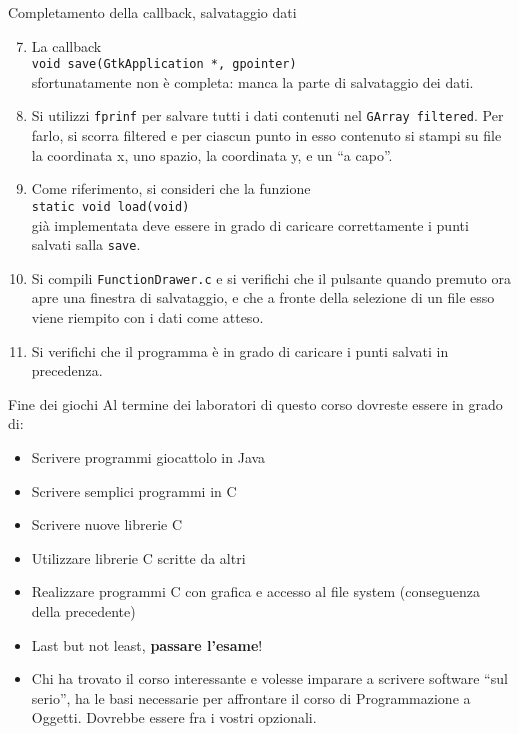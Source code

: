 \documentclass{beamer}
\begin{document}
\begin{frame}[fragile]{Completamento della callback, salvataggio dati}
\begin{enumerate}
\setcounter{enumi}{6}
 \item La callback \\ \texttt{void save(GtkApplication *, gpointer)} \\ sfortunatamente non è completa: manca la parte di salvataggio dei dati.
 \item Si utilizzi \texttt{fprinf} per salvare tutti i dati contenuti nel \texttt{GArray filtered}. Per farlo, si scorra filtered e per ciascun punto in esso contenuto si stampi su file la coordinata x, uno spazio, la coordinata y, e un ``a capo''.
 \item Come riferimento, si consideri che la funzione \\ \texttt{static void load(void)} \\ già implementata deve essere in grado di caricare correttamente i punti salvati salla \texttt{save}.
 \item Si compili \texttt{FunctionDrawer.c} e si verifichi che il pulsante quando premuto ora apre una finestra di salvataggio, e che a fronte della selezione di un file esso viene riempito con i dati come atteso.
 \item Si verifichi che il programma è in grado di caricare i punti salvati in precedenza.
\end{enumerate}
\end{frame}

\begin{frame}[fragile]{Fine dei giochi}
Al termine dei laboratori di questo corso dovreste essere in grado di:
\begin{itemize}
 \item Scrivere programmi giocattolo in Java
 \item Scrivere semplici programmi in C
 \item Scrivere nuove librerie C
 \item Utilizzare librerie C scritte da altri
 \item Realizzare programmi C con grafica e accesso al file system (conseguenza della precedente)
 \item Last but not least, \textbf{passare l'esame}!
 \item Chi ha trovato il corso interessante e volesse imparare a scrivere software ``sul serio'', ha le basi necessarie per affrontare il corso di Programmazione a Oggetti. Dovrebbe essere fra i vostri opzionali.
\end{itemize}
\end{frame}
\end{document}
